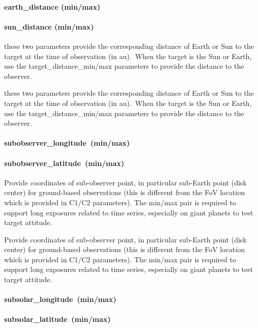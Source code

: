 \documentclass[11pt,a4paper]{ivoa}
\begin{document}
\paragraph{earth\_distance (min/max)}

\paragraph{sun\_distance (min/max)}

these two parameters provide the corresponding distance of Earth or Sun to the target at the time of observation (in au). When the target is the Sun or Earth, use the target\_distance\_min/max parameters to provide the distance to the observer.

these two parameters provide the corresponding distance of Earth or Sun to the target at the time of observation (in au). When the target is the Sun or Earth, use the target\_distance\_min/max parameters to provide the distance to the observer.

\paragraph{subobserver\_longitude (min/max)}

\paragraph{subobserver\_latitude (min/max)}

Provide coordinates of sub-observer point, in particular sub-Earth point (disk center) for ground-based observations (this is different from the FoV location which is provided in C1/C2 parameters). The min/max pair is required to support long exposures related to time series, especially on giant planets to test target attitude.

Provide coordinates of sub-observer point, in particular sub-Earth point (disk center) for ground-based observations (this is different from the FoV location which is provided in C1/C2 parameters). The min/max pair is required to support long exposures related to time series, especially on giant planets to test target attitude.

\paragraph{subsolar\_longitude (min/max)}

\paragraph{subsolar\_latitude (min/max)}
\end{document}
